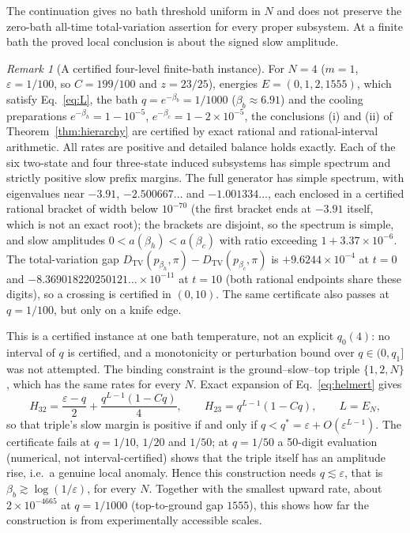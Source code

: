 \documentclass[11pt,a4paper]{article}
\theoremstyle{remark}\newtheorem{remark}[theorem]{Remark}
\newcommand{\TV}{D_{\mathrm{TV}}}
\begin{document}
The continuation gives no bath threshold uniform in $N$ and does not preserve the zero-bath all-time total-variation assertion for every proper subsystem. At a finite bath the proved local conclusion is about the signed slow amplitude.

\begin{remark}[A certified four-level finite-bath instance]\label{rem:hier4}
For $N=4$ ($m=1$, $\varepsilon=1/100$, so $C=199/100$ and $z=23/25$), energies $E=(0,1,2,1555)$, which satisfy Eq.~\eqref{eq:L}, the bath $q=e^{-\beta_b}=1/1000$ ($\beta_b\approx6.91$) and the cooling preparations $e^{-\beta_h}=1-10^{-5}$, $e^{-\beta_c}=1-2\times10^{-5}$, the conclusions (i) and (ii) of Theorem~\ref{thm:hierarchy} are certified by exact rational and rational-interval arithmetic. All rates are positive and detailed balance holds exactly. Each of the six two-state and four three-state induced subsystems has simple spectrum and strictly positive slow prefix margins. The full generator has simple spectrum, with eigenvalues near $-3.91$, $-2.500667\ldots$ and $-1.001334\ldots$, each enclosed in a certified rational bracket of width below $10^{-70}$ (the first bracket ends at $-3.91$ itself, which is not an exact root); the brackets are disjoint, so the spectrum is simple, and slow amplitudes $0<a(\beta_h)<a(\beta_c)$ with ratio exceeding $1+3.37\times10^{-6}$. The total-variation gap $\TV(p_{\beta_h},\pi)-\TV(p_{\beta_c},\pi)$ is $+9.6244\times10^{-4}$ at $t=0$ and $-8.369018220250121\ldots\times10^{-11}$ at $t=10$ (both rational endpoints share these digits), so a crossing is certified in $(0,10)$. The same certificate also passes at $q=1/100$, but only on a knife edge.

This is a certified instance at one bath temperature, not an explicit $q_0(4)$: no interval of $q$ is certified, and a monotonicity or perturbation bound over $q\in(0,q_1]$ was not attempted. The binding constraint is the ground--slow--top triple $\{1,2,N\}$, which has the same rates for every $N$. Exact expansion of Eq.~\eqref{eq:helmert} gives
\begin{equation}
 H_{32}=\frac{\varepsilon-q}{2}+\frac{q^{L-1}(1-Cq)}{4},\qquad
 H_{23}=q^{L-1}(1-Cq),\qquad L=E_N,
 \label{eq:q0triple}
\end{equation}
so that triple's slow margin is positive if and only if $q<q^*=\varepsilon+O(\varepsilon^{L-1})$. The certificate fails at $q=1/10$, $1/20$ and $1/50$; at $q=1/50$ a 50-digit evaluation (numerical, not interval-certified) shows that the triple itself has an amplitude rise, i.e.\ a genuine local anomaly. Hence this construction needs $q\lesssim\varepsilon$, that is $\beta_b\gtrsim\log(1/\varepsilon)$, for every $N$. Together with the smallest upward rate, about $2\times10^{-4665}$ at $q=1/1000$ (top-to-ground gap $1555$), this shows how far the construction is from experimentally accessible scales.
\end{remark}
\end{document}
